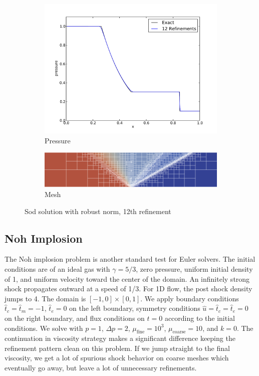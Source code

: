 \documentclass[Dissertation.tex]{subfiles}
\begin{document}
\begin{figure}[ht]
\begin{subfigure}[t]{0.45\textwidth}
\includegraphics[width=\textwidth]{Dissertation/Sod/Robust-pres13.pdf}
\caption{Pressure}
\end{subfigure}
\begin{subfigure}[t]{\textwidth}
\centering
\includegraphics[width=\textwidth]{Dissertation/Sod/Robust-mesh13.png}
\caption{Mesh}
\end{subfigure}
\caption{Sod solution with robust norm, 12th refinement}
\label{fig:SodRobust12}
\end{figure}

\subsection{Noh Implosion}
The Noh implosion problem\cite{Noh1987} is another standard test for Euler solvers.
The initial conditions are of an ideal gas with $\gamma=5/3$, zero pressure, uniform initial density of 1, 
and uniform velocity toward the center of the domain.
An infinitely strong shock propagates outward at a speed of 1/3.
For 1D flow, the post shock density jumps to 4.
The domain is $[-1,0]\times[0,1]$.
We apply boundary conditions $\hat t_c=\hat t_m=-1$, $\hat t_e=0$ on the left boundary,
symmetry conditions $\hat u=\hat t_c=\hat t_e=0$ on the right boundary, and flux conditions on $t=0$
according to the initial conditions.
We solve with $p=1$, $\Delta p=2$, $\mu_\text{fine}=10^3$, $\mu_\text{coarse}=10$, and $k=0$.
The continuation in viscosity strategy makes a significant difference keeping
the refinement pattern clean on this problem. 
If we jump straight to the final viscosity, we get a lot of spurious shock behavior on coarse meshes
which eventually go away, but leave a lot of unnecessary refinements.
\end{document}
